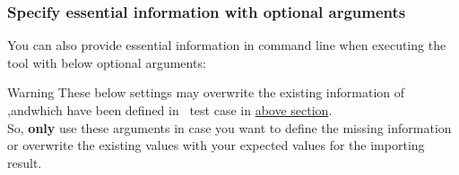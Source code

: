     \hypertarget{optional-arguments}{%
    \subsubsection{Specify essential information with optional arguments}
    \label{optional-arguments}}
      You can also provide essential information in command line when executing the
      \href{https://github.com/test-fullautomation/robotframework-robotlog2db}
      {\pkg} tool with below optional arguments:
    
      \begin{boxwarning}{Warning}
        These below settings may overwrite the existing information of
        ,andwhich have been 
        defined in \rfwcore\ test case in 
        \hyperref[description-robotframework-testcase-settings]{above section}.
        \\
        So, \textbf{only} use these arguments in case you want to define the 
        missing information or overwrite the existing values with your expected 
        values for the importing result.
      \end{boxwarning}

